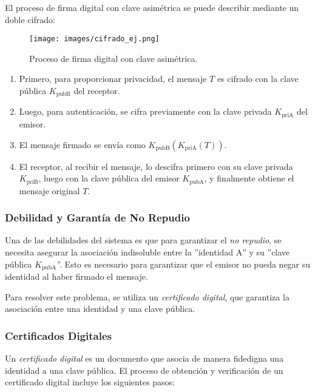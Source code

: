 \documentclass[a4paper,12pt]{article}
\begin{document}
El proceso de firma digital con clave asimétrica se puede describir mediante un doble cifrado:

\begin{figure}[H]
    \centering
    \texttt{[image: images/cifrado\_ej.png]}
    \caption{Proceso de firma digital con clave asimétrica.}
\end{figure}

\begin{enumerate}
    \item Primero, para proporcionar privacidad, el mensaje \( T \) es cifrado con la clave pública \( K_{\text{pubB}} \) del receptor.
    \item Luego, para autenticación, se cifra previamente con la clave privada \( K_{\text{priA}} \) del emisor.
    \item El mensaje firmado se envía como \( K_{\text{pubB}}( K_{\text{priA}}( T ) ) \).
    \item El receptor, al recibir el mensaje, lo descifra primero con su clave privada \( K_{\text{priB}} \), luego con la clave pública del emisor \( K_{\text{pubA}} \), y finalmente obtiene el mensaje original \( T \).
\end{enumerate}



\subsubsection{Debilidad y Garantía de No Repudio}

Una de las debilidades del sistema es que para garantizar el \textit{no repudio}, se necesita asegurar la asociación indisoluble entre la ''identidad A'' y su ''clave pública \( K_{\text{pubA}} \)''. Esto es necesario para garantizar que el emisor no pueda negar su identidad al haber firmado el mensaje.

Para resolver este problema, se utiliza un \textit{certificado digital}, que garantiza la asociación entre una identidad y una clave pública.

\subsubsection{Certificados Digitales}

Un \textit{certificado digital} es un documento que asocia de manera fidedigna una identidad a una clave pública. El proceso de obtención y verificación de un certificado digital incluye los siguientes pasos:
\end{document}
